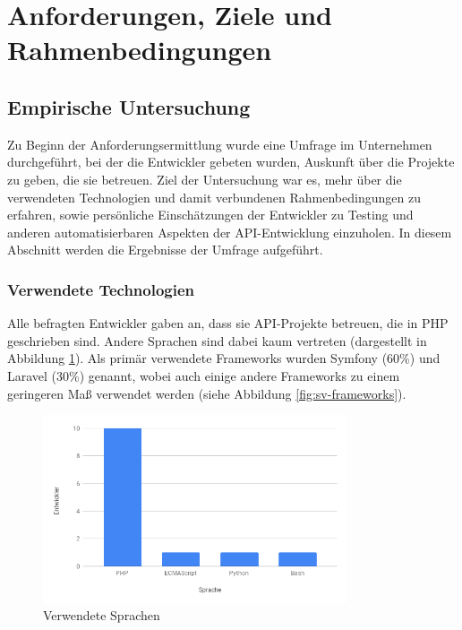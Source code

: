 
\section{Anforderungen, Ziele und Rahmenbedingungen}

\subsection{Empirische Untersuchung}

Zu Beginn der Anforderungsermittlung wurde eine Umfrage im Unternehmen durchgeführt, bei der die Entwickler gebeten wurden, Auskunft über die Projekte zu geben, die sie betreuen. Ziel der Untersuchung war es, mehr über die verwendeten Technologien und damit verbundenen Rahmenbedingungen zu erfahren, sowie persönliche Einschätzungen der Entwickler zu Testing und anderen automatisierbaren Aspekten der API-Entwicklung einzuholen. In diesem Abschnitt werden die Ergebnisse der Umfrage aufgeführt.

\subsubsection{Verwendete Technologien}

Alle befragten Entwickler gaben an, dass sie API-Projekte betreuen, die in PHP geschrieben sind. Andere Sprachen sind dabei kaum vertreten (dargestellt in Abbildung \ref{fig:sv-languages}). Als primär verwendete Frameworks wurden Symfony (60\%) und Laravel (30\%) genannt, wobei auch einige andere Frameworks zu einem geringeren Maß verwendet werden (siehe Abbildung \ref{fig:sv-frameworks}).

\begin{figure}[H]
\centering
  \includegraphics[width=0.8\textwidth]{../images/languages.png}
  \caption{Verwendete Sprachen}
  \label{fig:sv-languages}
\end{figure}


